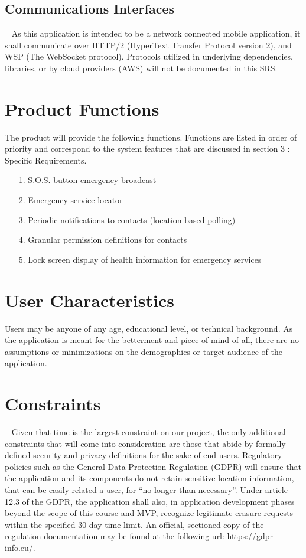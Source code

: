 \documentclass{scrreprt}
\begin{document}
\subsection{Communications Interfaces}
\par ~ As this application is intended to be a network connected mobile application, it shall communicate over HTTP/2 (HyperText Transfer Protocol version 2), and WSP (The WebSocket protocol). Protocols utilized in underlying dependencies, libraries, or by cloud providers (AWS) will not be documented in this SRS.


\section{Product Functions}
The product will provide the following functions. Functions are listed in order of priority and correspond to the system features that are discussed in section 3 : Specific Requirements. \begin{enumerate}
	\item[1.] S.O.S. button emergency broadcast
	\item[2.] Emergency service locator
	\item[3.] Periodic notifications to contacts (location-based polling)
	\item[4.] Granular permission definitions for contacts
	\item[5.] Lock screen display of health information for emergency services
\end{enumerate}


\section{User Characteristics}
Users may be anyone of any age, educational level, or technical background. As the application is meant for the betterment and piece of mind of all, there are no assumptions or minimizations on the demographics or target audience of the application.


\section{Constraints}
\par ~ Given that time is the largest constraint on our project, the only additional constraints that will come into consideration are those that abide by formally defined security and privacy definitions for the sake of end users. Regulatory policies such as the General Data Protection Regulation (GDPR) will ensure that the application and its components do not retain sensitive location information, that can be easily related a user, for ``no longer than necessary''. Under article 12.3 of the GDPR, the application shall also, in application development phases beyond the scope of this course and MVP, recognize legitimate erasure requests within the specified 30 day time limit. An official, sectioned copy of the regulation documentation may be found at the following url: \url{https://gdpr-info.eu/}.
\end{document}
